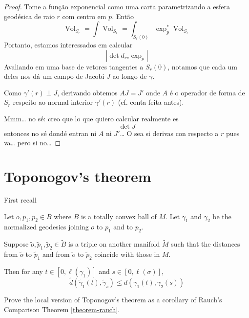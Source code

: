 \begin{theorem}
\label{theorem-bishop-gromov}

\end{theorem}

\begin{proof}
Tome a função exponencial como uma carta parametrizando a esfera geodésica de
raio $r$ com centro em $p$. Então
$$
\operatorname{Vol}_{S_r}=\int
\operatorname{Vol}_{S_r}=
\int_{S_r(0)}\operatorname{exp}_p^*\operatorname{Vol}_{S_r}
$$
Portanto, estamos interessados em calcular 
$$
|\det d_{rv} \operatorname{exp}_p|
$$
Avaliando em uma base de vetores tangentes a $S_r(0)$, notamos que cada um deles
nos dá um campo de Jacobi $J$ ao longo de $\gamma$.

Como $\gamma'(r)\perp J$, derivando obtemos $A J=J'$ onde $A$ é o operador de
forma de $S_r$ respeito ao normal interior $\gamma'(r)$ (cf. conta feita antes).

Mmm… no sé: creo que lo que quiero calcular realmente es
$$
\det J
$$
entonces no sé dondé entran ni $A$ ni $J'$… O sea si derivas con respecto a $r$
pues va… pero si no…

\end{proof}

\section{Toponogov's theorem}
\label{section-toponogov}

First recall

\begin{theorem}
\label{theorem-toponogov,local}
Let $o,p_1,p_2 \in B$ where $B$ is a totally convex ball of $M$. Let $\gamma_1$
and $\gamma_2$ be the normalized geodesics joining $o$ to $p_1$ and to $p_2$.

Suppose $\tilde{o}, \tilde{p}_1,\tilde{p}_2 \in \tilde{B}$ is a triple on 
another manifold $\tilde{M}$ such that the distances from $\tilde{o}$ to
$\tilde{p}_1$ and from $\tilde{o}$ to $\tilde{p}_2$ coincide with those in $M$.

Then for any $t \in [0,\ell(\gamma_1)]$ and $s \in [0,\ell(\sigma)]$,
$$
\tilde{d}(\tilde{\gamma}_1(t),\tilde{\gamma}_s)\leq d(\gamma_1(t),\gamma_2(s))
$$
\end{theorem}

\begin{exercise}[Lista 7]
\label{exercise-toponogov-from-rauch}
Prove the local version of Toponogov's theorem as a corollary of Rauch's
Comparison Theorem \ref{theorem-rauch}.
\end{exercise}

